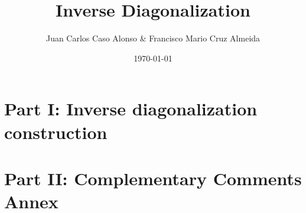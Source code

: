 \documentclass[notitlepage]{report}
\title{Inverse Diagonalization}
\author{Juan Carlos Caso Alonso \& Francisco Mario Cruz Almeida}
\date{\today}
\begin{document}
	
	\maketitle
	\thispagestyle{empty}
	
	
		
	
	\tableofcontents
	
	\part{Part I: Inverse diagonalization construction}

	
	
	
	\part{Part II: Complementary Comments Annex}
	
	
\end{document}
